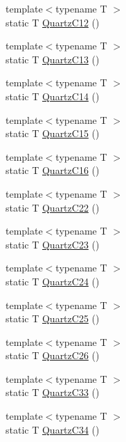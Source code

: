 \begin{DoxyCompactItemize}
\item 
{\footnotesize template$<$typename T $>$ }\\static T \mbox{\hyperlink{namespacempc_1_1data_a86c5e86442a51cd3acc7a7372df10ada}{Quartz\+C12}} ()
\item 
{\footnotesize template$<$typename T $>$ }\\static T \mbox{\hyperlink{namespacempc_1_1data_a625fcdf103d4b918b92c4e32cf14e2bf}{Quartz\+C13}} ()
\item 
{\footnotesize template$<$typename T $>$ }\\static T \mbox{\hyperlink{namespacempc_1_1data_afe8687899480b1c9ed8b3c94cd50d72a}{Quartz\+C14}} ()
\item 
{\footnotesize template$<$typename T $>$ }\\static T \mbox{\hyperlink{namespacempc_1_1data_a31080845468acf04e9476b7cb7e295a6}{Quartz\+C15}} ()
\item 
{\footnotesize template$<$typename T $>$ }\\static T \mbox{\hyperlink{namespacempc_1_1data_ab5360005bfa984f008538036e4ea9736}{Quartz\+C16}} ()
\item 
{\footnotesize template$<$typename T $>$ }\\static T \mbox{\hyperlink{namespacempc_1_1data_a2779c542c70a49b6aa46b2f4c51d0d7f}{Quartz\+C22}} ()
\item 
{\footnotesize template$<$typename T $>$ }\\static T \mbox{\hyperlink{namespacempc_1_1data_a5d7209e35c2db94425f014fa1a06cbb0}{Quartz\+C23}} ()
\item 
{\footnotesize template$<$typename T $>$ }\\static T \mbox{\hyperlink{namespacempc_1_1data_a465213d9ac9cdde3d80ff7612aa900ab}{Quartz\+C24}} ()
\item 
{\footnotesize template$<$typename T $>$ }\\static T \mbox{\hyperlink{namespacempc_1_1data_a93fa72541df2415317eab5443cc726b1}{Quartz\+C25}} ()
\item 
{\footnotesize template$<$typename T $>$ }\\static T \mbox{\hyperlink{namespacempc_1_1data_a10171fdf3dd221b514c406c3d84aeffe}{Quartz\+C26}} ()
\item 
{\footnotesize template$<$typename T $>$ }\\static T \mbox{\hyperlink{namespacempc_1_1data_a36a7547f9901cc8e4b8c251f2fd8cd09}{Quartz\+C33}} ()
\item 
{\footnotesize template$<$typename T $>$ }\\static T \mbox{\hyperlink{namespacempc_1_1data_afc8740dfef007c43337f0895455462b7}{Quartz\+C34}} ()

\end{DoxyCompactItemize}
